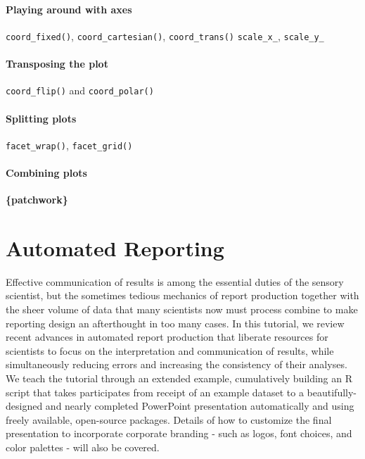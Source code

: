 \documentclass[
]{book}
\begin{document}
\hypertarget{playing-around-with-axes}{%
\subsubsection{Playing around with axes}\label{playing-around-with-axes}}

\texttt{coord\_fixed()}, \texttt{coord\_cartesian()}, \texttt{coord\_trans()}
\texttt{scale\_x\_}, \texttt{scale\_y\_}

\hypertarget{transposing-the-plot}{%
\subsubsection{Transposing the plot}\label{transposing-the-plot}}

\texttt{coord\_flip()} and \texttt{coord\_polar()}

\hypertarget{splitting-plots}{%
\subsubsection{Splitting plots}\label{splitting-plots}}

\texttt{facet\_wrap()}, \texttt{facet\_grid()}

\hypertarget{combining-plots}{%
\subsubsection{Combining plots}\label{combining-plots}}

\textbf{\{patchwork\}}

\hypertarget{auto-report}{%
\chapter{Automated Reporting}\label{auto-report}}

Effective communication of results is among the essential duties of the sensory scientist, but the sometimes tedious mechanics of report production together with the sheer volume of data that many scientists now must process combine to make reporting design an afterthought in too many cases. In this tutorial, we review recent advances in automated report production that liberate resources for scientists to focus on the interpretation and communication of results, while simultaneously reducing errors and increasing the consistency of their analyses. We teach the tutorial through an extended example, cumulatively building an R script that takes participates from receipt of an example dataset to a beautifully-designed and nearly completed PowerPoint presentation automatically and using freely available, open-source packages. Details of how to customize the final presentation to incorporate corporate branding - such as logos, font choices, and color palettes - will also be covered.
\end{document}
